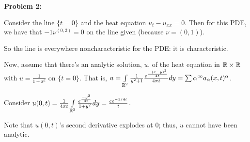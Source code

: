 \documentclass[a4paper,12pt]{article}
\begin{document}
\shunt

{\bf Problem 2:}

Consider the line $\{t=0\}$ and the heat equation $u_t-u_{xx} = 0$. Then for this PDE, we have that $-1\nu^{(0,2)}=0$ on the line given (because $\nu = (0,1)$). %

So the line is everywhere noncharacteristic for the PDE: it is characteristic. 

Now, assume that there's an analytic solution, $u$, of the heat equation in $\mathbb{R} \times \mathbb{R}$ with $u = \frac{1}{1+x^2}$ on $\{t=0\}$. That is, $u = \int\limits_{\mathbb{R}^2} \frac{1}{y^2+1} \frac{e^{\frac{-(x-y)^2}{4t}}}{4\pi t} dy = \sum\limits{\alpha}^\infty a_\alpha (x,t)^\alpha$.

Consider $u(0,t) = \frac{1}{4\pi t} \int\limits_{\mathbb{R}^2} \frac{e^{\frac{-y^2}{4t}}}{1+y^2} dy = \frac{ce^{-1/4t}}{t}$. 

Note that $u(0,t)$'s second derivative explodes at $0$; thus, $u$ cannot have been analytic. 

\shunt
\end{document}
